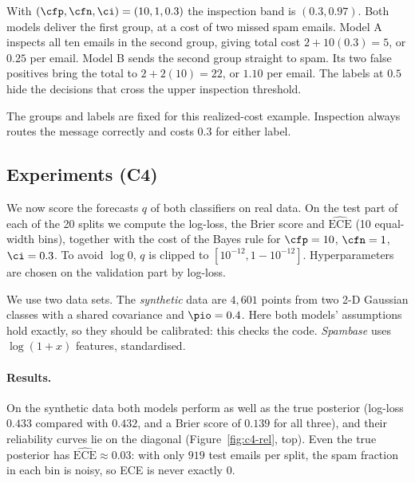 With $(\cfp,\cfn,\ci)=(10,1,0.3)$ the inspection band is $(0.3,0.97)$. Both models deliver
the first group, at a cost of two missed spam emails. Model A inspects all ten emails
in the second group, giving total cost $2+10(0.3)=5$, or $0.25$ per email. Model B sends
the second group straight to spam. Its two false positives bring the total to $2+2(10)=22$,
or $1.10$ per email. The labels at $0.5$ hide the decisions that cross the upper
inspection threshold.
\begin{assumptions}The groups and labels are fixed for this realized-cost example.
Inspection always routes the message correctly and costs $0.3$ for either label.\end{assumptions}

\subsection{Experiments (C4)}
\label{sec:c4}

We now score the forecasts $q$ of both classifiers on real data. On the test part of each of the 20 splits
we compute the log-loss, the Brier score and $\widehat{\mathrm{ECE}}$ (10 equal-width bins), together with
the cost of the Bayes rule for $\cfp=10$, $\cfn=1$, $\ci=0.3$. To avoid $\log 0$, $q$ is clipped to
$[10^{-12},1-10^{-12}]$. Hyperparameters are chosen on the validation part by log-loss.

We use two data sets. The \emph{synthetic} data are $4{,}601$ points from two 2-D Gaussian classes with a
shared covariance and $\pio=0.4$. Here both models' assumptions hold exactly, so they should be calibrated:
this checks the code. \emph{Spambase} uses $\log(1+x)$ features, standardised.

\begin{table}[ht]
\centering\footnotesize\setlength{\tabcolsep}{3.5pt}

\caption{Forecast quality on the test part (mean $\pm$ standard error over 20 splits). Accuracy uses
``spam iff $q\ge0.5$''; Cost and Inspected are for the Bayes rule. ``Bayes (true $p$)'' is the true
posterior; ``+ Platt'' rows are re-calibrated on the validation part.}
\label{tab:c4-scores}
\end{table}

\paragraph{Results.}
On the synthetic data both models perform as well as the true posterior (log-loss $0.433$ compared with
$0.432$, and a Brier score of $0.139$ for all three), and their reliability curves lie on the diagonal (Figure~\ref{fig:c4-rel}, top). Even the true posterior has
$\widehat{\mathrm{ECE}}\approx0.03$: with only $919$ test emails per split, the spam fraction in each bin is
noisy, so ECE is never exactly $0$.

